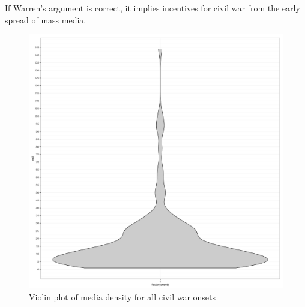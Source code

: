 \documentclass[11pt,article,oneside]{memoir}
\makeatletter
\def\maxwidth{\ifdim\Gin@nat@width>\linewidth\linewidth
\else\Gin@nat@width\fi}
\let\Oldincludegraphics\includegraphics
\renewcommand{\includegraphics}[1]{\Oldincludegraphics[width=\maxwidth]{#1}}
\makeatother
\begin{document}
If Warren's argument is correct, it implies incentives for civil war
from the early spread of mass media.

\begin{figure}[htbp]
\centering
\includegraphics{figure/violinplot.pdf}
\caption{Violin plot of media density for all civil war onsets}
\end{figure}
\end{document}

